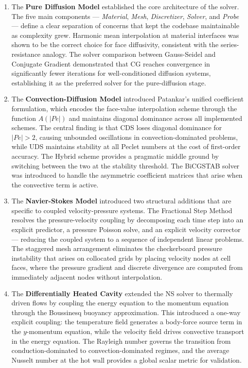 \begin{enumerate}
    \item The \textbf{Pure Diffusion Model} established the core architecture of the solver. The five main components — \textit{Material}, \textit{Mesh}, \textit{Discretizer}, \textit{Solver}, and \textit{Probe} — define a clear separation of concerns that kept the codebase maintainable as complexity grew. Harmonic mean interpolation at material interfaces was shown to be the correct choice for face diffusivity, consistent with the series-resistance analogy. The solver comparison between Gauss-Seidel and Conjugate Gradient demonstrated that CG reaches convergence in significantly fewer iterations for well-conditioned diffusion systems, establishing it as the preferred solver for the pure-diffusion stage.

    \item The \textbf{Convection-Diffusion Model} introduced Patankar's unified coefficient formulation, which encodes the face-value interpolation scheme through the function $A(|Pe|)$ and maintains diagonal dominance across all implemented schemes. The central finding is that CDS loses diagonal dominance for $|Pe| > 2$, causing unbounded oscillations in convection-dominated problems, while UDS maintains stability at all Peclet numbers at the cost of first-order accuracy. The Hybrid scheme provides a pragmatic middle ground by switching between the two at the stability threshold. The BiCGSTAB solver was introduced to handle the asymmetric coefficient matrices that arise when the convective term is active.

    \item The \textbf{Navier-Stokes Model} introduced two structural additions that are specific to coupled velocity-pressure systems. The Fractional Step Method resolves the pressure-velocity coupling by decomposing each time step into an explicit predictor, a pressure Poisson solve, and an explicit velocity corrector — reducing the coupled system to a sequence of independent linear problems. The staggered mesh arrangement eliminates the checkerboard pressure instability that arises on collocated grids by placing velocity nodes at cell faces, where the pressure gradient and discrete divergence are computed from immediately adjacent nodes without interpolation.

    \item The \textbf{Differentially Heated Cavity} extended the NS solver to thermally driven flows by coupling the energy equation to the momentum equation through the Boussinesq buoyancy approximation. This introduced a one-way explicit coupling: the temperature field generates a body-force source term in the $y$-momentum equation, while the velocity field drives convective transport in the energy equation. The Rayleigh number governs the transition from conduction-dominated to convection-dominated regimes, and the average Nusselt number at the hot wall provides a global scalar metric for validation.


\end{enumerate}

